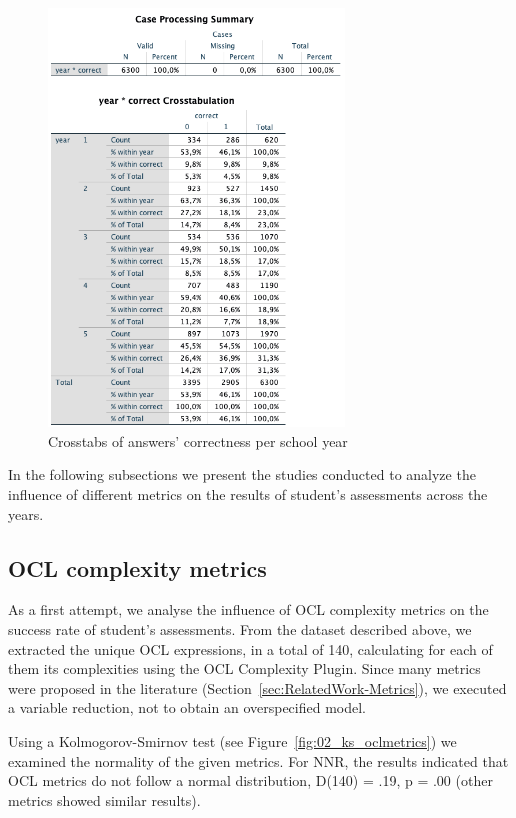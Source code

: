 \begin{figure}[ht]
\centering
\includegraphics[width=0.7\textwidth]{Chapters/figures/6_Results/Section2/02_CrossTabs_CorrectnessPerYear.png}
\caption{Crosstabs of answers' correctness per school year}
\label{fig:02_barchart_answersperschoolyear}
\end{figure}

In the following subsections we present the studies conducted to analyze the influence of different metrics on the results of student's assessments across the years.

\subsection{OCL complexity metrics}
\label{Results-OCLComplexityMetrics}

As a first attempt, we analyse the influence of OCL complexity metrics on the success rate of student's assessments. From the dataset described above, we extracted the unique OCL expressions, in a total of 140, calculating for each of them its complexities using the OCL Complexity Plugin. Since many metrics were proposed in the literature (Section~\ref{sec:RelatedWork-Metrics}), we executed a variable reduction, not to obtain an overspecified model. 

Using a Kolmogorov-Smirnov test (see Figure~\ref{fig:02_ks_oclmetrics}) we examined the normality of the given metrics. For NNR, the results indicated that OCL metrics do not follow a normal distribution, D(140) = .19, p = .00 (other metrics showed similar results).

